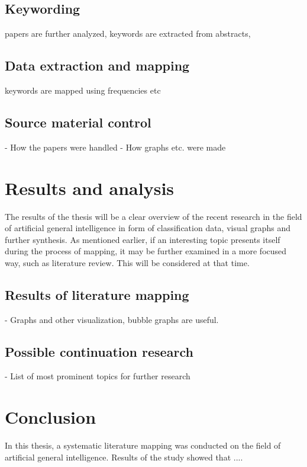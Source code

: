 \documentclass[utf8,english]{gradu3}
\begin{document}
\section{Keywording}
papers are further analyzed, keywords are extracted from abstracts, 

\section{Data extraction and mapping}
keywords are mapped using frequencies etc

\section{Source material control}
- How the papers were handled
- How graphs etc. were made

\chapter{Results and analysis}
The results of the thesis will be a clear overview of the recent research in the field of artificial general intelligence in form of classification data, visual graphs and further synthesis. As mentioned earlier, if an interesting topic presents itself during the process of mapping, it may be further examined in a more focused way, such as literature review. This will be considered at that time.

\section{Results of literature mapping}
- Graphs and other visualization, bubble graphs are useful.

\section{Possible continuation research}

- List of most prominent topics for further research

\chapter{Conclusion}
In this thesis, a systematic literature mapping was conducted on the field of artificial general intelligence. Results of the study showed that .... 

\printbibliography
\end{document}
